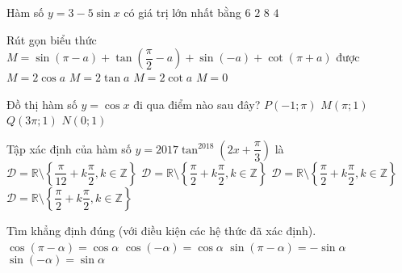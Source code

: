 \begin{ex}%
	Hàm số $y=3-5\sin x$ có giá trị lớn nhất bằng
	\choice
	{$6$}
	{$2$}
	{\True $8$}
	{$4$}
\end{ex}

\begin{ex}%
	Rút gọn biểu thức $M=\sin(\pi-a)+\tan\left(\dfrac{\pi}{2}-a\right)+\sin(-a)+\cot(\pi+a)$ được
	\choice
	{$M=2\cos a$}
	{$M=2\tan a$}
	{\True $M=2\cot a$}
	{$M=0$}
\end{ex}

\begin{ex}%
	Đồ thị hàm số $y=\cos x$ đi qua điểm nào sau đây?
	\choice
	{$P(-1;\pi)$}
	{$M(\pi;1)$}
	{$Q(3\pi; 1)$}
	{\True $N(0;1)$}
\end{ex}

\begin{ex}%
	Tập xác định của hàm số $y=2017\tan^{2018} \left( 2x+\dfrac{\pi}{3}\right)$ là
	\choice
	{\True $\mathscr{D}=\mathbb{R}\setminus\left\lbrace\dfrac{\pi}{12}+k\dfrac{\pi}{2}, k\in\mathbb{Z} \right\rbrace $}
	{$\mathscr{D}=\mathbb{R}\setminus\left\lbrace\dfrac{\pi}{2}+k\dfrac{\pi}{2}, k\in\mathbb{Z} \right\rbrace $}
	{$\mathscr{D}=\mathbb{R}\setminus\left\lbrace\dfrac{\pi}{2}+k\dfrac{\pi}{2}, k\in\mathbb{Z} \right\rbrace $}
	{$\mathscr{D}=\mathbb{R}\setminus\left\lbrace\dfrac{\pi}{2}+k\dfrac{\pi}{2}, k\in\mathbb{Z} \right\rbrace $}
\end{ex}

\begin{ex}%
	Tìm khẳng định đúng (với điều kiện các hệ thức đã xác định).
	\choice
	{$\cos \left(\pi -\alpha \right)=\cos \alpha$}
	{\True $\cos \left(-\alpha \right)=\cos \alpha$}
	{$\sin \left(\pi -\alpha \right)=-\sin \alpha$}
	{$\sin \left(-\alpha \right)=\sin \alpha$}
\end{ex}


